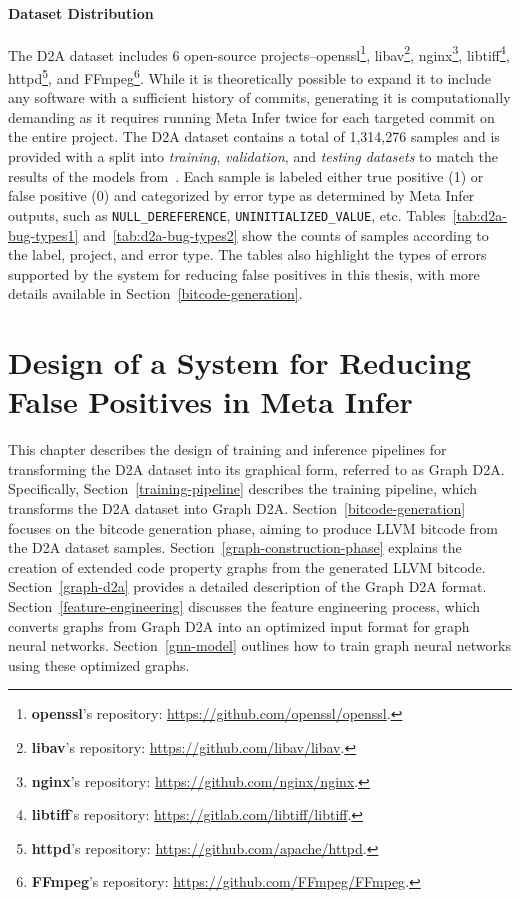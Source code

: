 \subsubsection{Dataset Distribution}
The D2A dataset includes 6 open-source projects--openssl\footnote{\textbf{openssl}'s repository: \url{https://github.com/openssl/openssl}.}, libav\footnote{\textbf{libav}'s repository: \url{https://github.com/libav/libav}.}, nginx\footnote{\textbf{nginx}'s repository: \url{https://github.com/nginx/nginx}.}, libtiff\footnote{\textbf{libtiff}'s repository: \url{https://gitlab.com/libtiff/libtiff}.}, httpd\footnote{\textbf{httpd}'s repository: \url{https://github.com/apache/httpd}.}, and FFmpeg\footnote{\textbf{FFmpeg}'s repository: \url{https://github.com/FFmpeg/FFmpeg}.}. While it is theoretically possible to expand it to include any software with a sufficient history of commits, generating it is computationally demanding as it requires running Meta Infer twice for each targeted commit on the entire project. The D2A dataset contains a total of 1,314,276 samples and is provided with a split into \textit{training}, \textit{validation}, and \textit{testing datasets} to match the results of the models from~\cite{D2A-zheng2021d2a, pujar2024analyzing}. Each sample is labeled either true positive (1) or false positive (0) and categorized by error type as determined by Meta Infer outputs, such as \texttt{NULL\_DEREFERENCE}, \texttt{UNINITIALIZED\_VALUE}, etc. Tables~\ref{tab:d2a-bug-types1} and~\ref{tab:d2a-bug-types2} show the counts of samples according to the label, project, and error type. The tables also highlight the types of errors supported by the system for reducing false positives in this thesis, with more details available in Section~\ref{bitcode-generation}.


\chapter{Design of a System for Reducing False Positives in Meta Infer}
\label{design}
This chapter describes the design of training and inference pipelines for transforming the D2A dataset into its graphical form, referred to as Graph D2A. Specifically, Section~\ref{training-pipeline} describes the training pipeline, which transforms the D2A dataset into Graph D2A. Section~\ref{bitcode-generation} focuses on the bitcode generation phase, aiming to produce LLVM bitcode from the D2A dataset samples. Section~\ref{graph-construction-phase} explains the creation of extended code property graphs from the generated LLVM bitcode. Section~\ref{graph-d2a} provides a detailed description of the Graph D2A format. Section~\ref{feature-engineering} discusses the feature engineering process, which converts graphs from Graph D2A into an optimized input format for graph neural networks. Section~\ref{gnn-model} outlines how to train graph neural networks using these optimized graphs.


